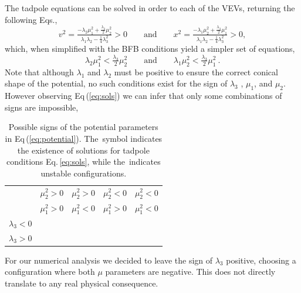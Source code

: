 \documentclass[10pt]{report}
\newcommand{\xmark}{\ding{55}}%
\begin{document}
The tadpole equations can be solved in order to each of the VEVs, returning the following Eqs.,
%
\begin{equation}
v^2 = \tfrac{-\lambda_2 \mu_1^2 + \tfrac{\lambda_3}{2}\mu_2^2}{\lambda_1 \lambda_2 - \tfrac{1}{4}\lambda_3^2} > 0
\qquad
\text{and}
\qquad
x^2 = \tfrac{-\lambda_1 \mu_2^2 + \tfrac{\lambda_3}{2}\mu_1^2}{\lambda_1 \lambda_2 - \tfrac{1}{4}\lambda_3^2} > 0 , 
\label{eq:extremum}
\end{equation}
%
which, when simplified with the BFB conditions yield a simpler set of equations,
%
\begin{equation}
\lambda_2 \mu_1^2 < \tfrac{\lambda_3}{2} \mu_2^2 
\qquad
\text{and}
\qquad
\lambda_1 \mu_2^2 < \tfrac{\lambda_3}{2} \mu_1^2 \ . 
\label{eq:sols}
\end{equation}
%
Note that although $\lambda_1$ and $\lambda_2$ must be positive to ensure the correct conical shape of the potential, no such conditions exist for the sign of $\lambda_3$ , $\mu_1$, and $\mu_2$. However observing Eq\,(\ref{eq:sols}) we can infer that only some combinations of signs are impossible, 
%
\begin{table}[!htb]
	\begin{center}
		\begin{tabular}{ccccc}
			& $\mu_2^2 > 0$ & $\mu_2^2 > 0$ & $\mu_2^2 < 0$ & $\mu_2^2 < 0$  	\\
			& $\mu_1^2 > 0$ & $\mu_1^2 < 0$ & $\mu_1^2 > 0$ & $\mu_1^2 < 0$  	\\        
			\hline  
			$\lambda_3 < 0 $     			    							& 	\xmark		& \checkmark	&	\checkmark & \checkmark	\\
			$\lambda_3 > 0$     			    							& \xmark		& \xmark	&	\xmark &  \checkmark \\
			\hline
		\end{tabular} 
		\caption{Possible signs of the potential parameters in Eq\,(\ref{eq:potential}). 
			The \checkmark\,symbol indicates the existence of solutions for tadpole conditions Eq.\,\eqref{eq:sols}, while the \xmark\,indicates unstable configurations.}
		\label{tab:signs}  
	\end{center}
\end{table} 
%
For our numerical analysis we decided to leave the sign of $\lambda_3$ positive, choosing a configuration where both $\mu$ parameters are negative. 
%
This does not directly translate to any real physical consequence.
\end{document}

